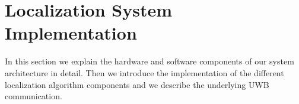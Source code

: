 
\chapter{Localization System Implementation} %

\label{Chapter5} %
In this section we explain the hardware and software components of our system architecture in detail. Then we introduce the implementation of the different localization algorithm components and we describe the underlying UWB communication.


